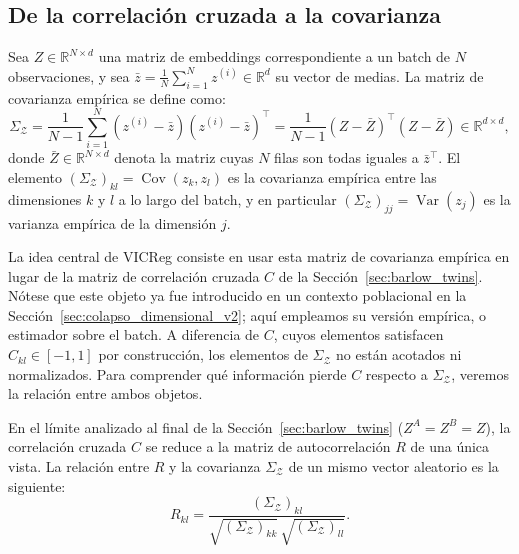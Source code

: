 \subsection{De la correlación cruzada a la covarianza}

\begin{definition}
\label{def:cov_empirica_vicreg}
Sea $Z \in \mathbb{R}^{N \times d}$ una matriz de embeddings correspondiente a un batch de $N$ observaciones, y sea $\bar{z} = \frac{1}{N}\sum_{i=1}^{N} z^{(i)} \in \mathbb{R}^d$ su vector de medias. La matriz de covarianza empírica se define como:
\begin{equation}
\label{eq:cov_empirica_vicreg}
\Sigma_\mathcal{Z} = \frac{1}{N-1} \sum_{i=1}^{N} (z^{(i)} - \bar{z})(z^{(i)} - \bar{z})^\top = \frac{1}{N-1} (Z - \bar{Z})^\top (Z - \bar{Z}) \in \mathbb{R}^{d \times d},
\end{equation}
donde $\bar{Z} \in \mathbb{R}^{N \times d}$ denota la matriz cuyas $N$ filas son todas iguales a $\bar{z}^\top$. El elemento $(\Sigma_\mathcal{Z})_{kl}=\operatorname{Cov}(z_{k},z_{l})$ es la covarianza empírica entre las dimensiones $k$ y $l$ a lo largo del batch, y en particular $(\Sigma_\mathcal{Z})_{jj} = \operatorname{Var}(z_{j})$ es la varianza empírica de la dimensión $j$.
\end{definition}

La idea central de VICReg consiste en usar esta matriz de covarianza empírica en lugar de la matriz de correlación cruzada $C$ de la Sección~\ref{sec:barlow_twins}. Nótese que este objeto ya fue introducido en un contexto poblacional en la Sección~\ref{sec:colapso_dimensional_v2}; aquí empleamos su versión empírica, o estimador sobre el batch. A diferencia de $C$, cuyos elementos satisfacen $C_{kl} \in [-1,1]$ por construcción, los elementos de $\Sigma_\mathcal{Z}$ no están acotados ni normalizados. Para comprender qué información pierde $C$ respecto a $\Sigma_\mathcal{Z}$, veremos la relación entre ambos objetos.

En el límite analizado al final de la Sección~\ref{sec:barlow_twins} ($Z^A = Z^B = Z$), la correlación cruzada $C$ se reduce a la matriz de autocorrelación $R$ de una única vista. La relación entre $R$ y la covarianza $\Sigma_\mathcal{Z}$ de un mismo vector aleatorio es la siguiente: 
\begin{equation}
\label{eq:relacion_R_Sigma}
R_{kl} = \frac{(\Sigma_\mathcal{Z})_{kl}}{\sqrt{(\Sigma_\mathcal{Z})_{kk}}\,\sqrt{(\Sigma_\mathcal{Z})_{ll}}}.
\end{equation}

